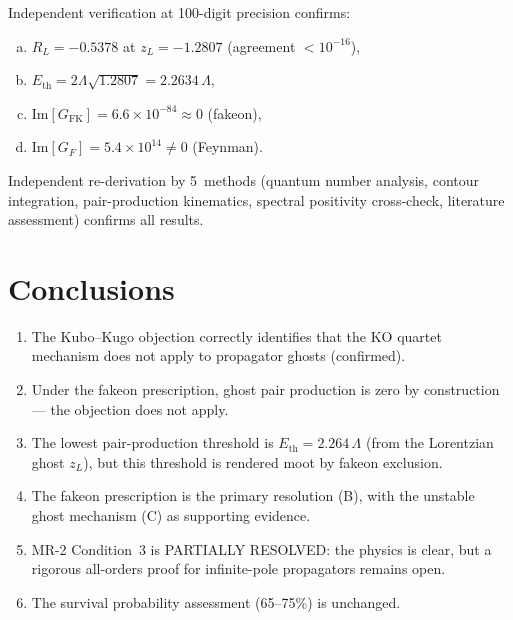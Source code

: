 \documentclass[11pt,a4paper]{article}
\newcommand{\Imag}{\mathrm{Im}}
\begin{document}
Independent verification at 100-digit precision confirms:
\begin{enumerate}[(a)]
  \item $R_L = -0.5378$ at $z_L = -1.2807$ (agreement $< 10^{-16}$),
  \item $E_{\text{th}} = 2\Lambda\sqrt{1.2807} = 2.2634\,\Lambda$,
  \item $\Imag[G_{\text{FK}}] = 6.6 \times 10^{-84} \approx 0$ (fakeon),
  \item $\Imag[G_F] = 5.4 \times 10^{14} \neq 0$ (Feynman).
\end{enumerate}

Independent re-derivation by 5~methods (quantum number analysis,
contour integration, pair-production kinematics, spectral positivity
cross-check, literature assessment) confirms all results.


\section{Conclusions}
\label{sec:conclusions}

\begin{enumerate}
  \item The Kubo--Kugo objection correctly identifies that the KO
    quartet mechanism does not apply to propagator ghosts (confirmed).
  \item Under the fakeon prescription, ghost pair production is zero
    by construction --- the objection does not apply.
  \item The lowest pair-production threshold is
    $E_{\text{th}} = 2.264\,\Lambda$ (from the Lorentzian ghost $z_L$),
    but this threshold is rendered moot by fakeon exclusion.
  \item The fakeon prescription is the primary resolution (B), with
    the unstable ghost mechanism (C) as supporting evidence.
  \item MR-2 Condition~3 is PARTIALLY RESOLVED: the physics is clear,
    but a rigorous all-orders proof for infinite-pole propagators
    remains open.
  \item The survival probability assessment (65--75\%) is unchanged.
\end{enumerate}
\end{document}
